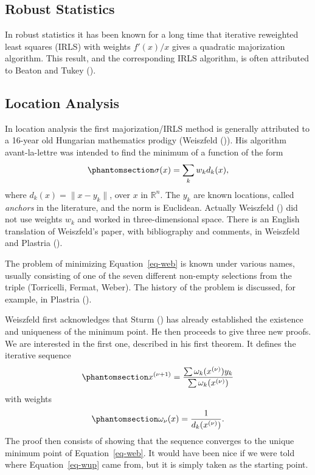 \documentclass[
  12pt,
  letterpaper,
  DIV=11,
  numbers=noendperiod]{scrartcl}
\theoremstyle{plain}
\theoremstyle{plain}
\theoremstyle{plain}
\theoremstyle{definition}
\theoremstyle{definition}
\theoremstyle{remark}
\begin{document}
\subsection{Robust Statistics}\label{robust-statistics}

In robust statistics it has been known for a long time that iterative
reweighted least squares (IRLS) with weights \(f'(x)/x\) gives a
quadratic majorization algorithm. This result, and the corresponding
IRLS algorithm, is often attributed to Beaton and Tukey
().

\subsection{Location Analysis}\label{location-analysis}

In location analysis the first majorization/IRLS method is generally
attributed to a 16-year old Hungarian mathematics prodigy (Weiszfeld
()). His algorithm avant-la-lettre was
intended to find the minimum of a function of the form
\begin{equation}\phantomsection\label{eq-web}{
\sigma(x)=\sum_k w_kd_k(x),
}\end{equation} where \(d_k(x)=\|x-y_k\|\), over \(x\) in
\(\mathbb{R}^n\). The \(y_k\) are known locations, called \emph{anchors}
in the literature, and the norm is Euclidean. Actually Weiszfeld
() did not use weights \(w_k\) and
worked in three-dimensional space. There is an English translation of
Weiszfeld's paper, with bibliography and comments, in Weiszfeld and
Plastria ().

The problem of minimizing Equation~\ref{eq-web} is known under various
names, usually consisting of one of the seven different non-empty
selections from the triple (Torricelli, Fermat, Weber). The history of
the problem is discussed, for example, in Plastria
().

Weiszfeld first acknowledges that Sturm ()
has already established the existence and uniqueness of the minimum
point. He then proceeds to give three new proofs. We are interested in
the first one, described in his first theorem. It defines the iterative
sequence \begin{equation}\phantomsection\label{eq-wup}{
x^{(\nu+1)}=\frac{\sum\omega_k(x^{(\nu)})y_k}{\sum\omega_k(x^{(\nu)})}
}\end{equation} with weights
\begin{equation}\phantomsection\label{eq-ww}{
\omega_\nu(x)=\frac{1}{d_k(x^{(\nu)})}.
}\end{equation} The proof then consists of showing that the sequence
converges to the unique minimum point of Equation~\ref{eq-web}. It would
have been nice if we were told where Equation~\ref{eq-wup} came from,
but it is simply taken as the starting point.
\end{document}
